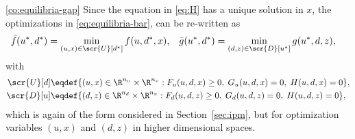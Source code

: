 \documentclass[11pt]{article}
\begin{document}
\begin{proof-corollary}{\ref{co:equilibria-gap}}
  Since the equation in \eqref{eq:H} has a unique solution in $x$, the
  optimizations in \eqref{eq:equilibria-bar}, can be re-written as
  \begin{align}\label{eq:equilibria-x}
    \bar f(u^*,d^*)&=\min_{(u,x)\in\scr{U}[d^*]} f(u,d^*,x), &
    \bar g(u^*,d^*)&=\min_{(d,z)\in\scr{D}[u^*]} g(u^*,d,z),
  \end{align}
  with
  \begin{align}
    \scr{U}[d]&\eqdef\{(u,x)\in\R^{n_u}\times\R^{n_x}: F_u(u,d,x)\ge 0,\; G_u(u,d,x)=0,\;H(u,d,x)=0\}, \\
    \scr{D}[u]&\eqdef\{(d,z)\in\R^{n_d}\times\R^{n_x}: F_d(u,d,z)\ge 0,\; G_d(u,d,z)=0,\;H(u,d,z)=0\},
  \end{align}
  which is again of the form considered in Section~\ref{sec:ipm}, but
  for optimization variables $(u,x)$ and $(d,z)$ in higher dimensional
  spaces.
  
  \medskip
  

\end{proof-corollary}
\end{document}
